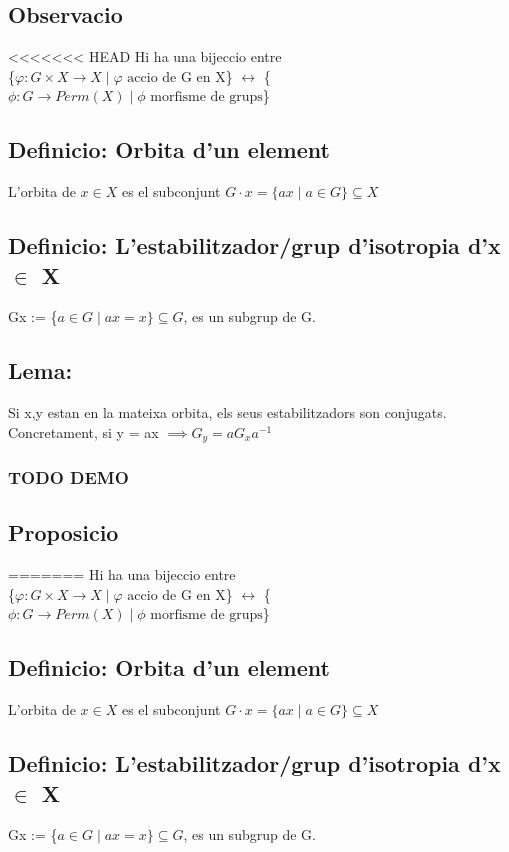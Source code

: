 \documentclass[11pt]{article}
\begin{document}
\subsection{Observacio}
<<<<<<< HEAD
\label{sec:orgb9528f3}
Hi ha una bijeccio entre \\
\{\(\varphi: G \times X \to X \mid \varphi \text{ accio de G en X}\)\} \(\leftrightarrow\) \{\(\phi: G \to Perm(X) \mid \phi \text{ morfisme de grups}\)\}
\subsection{Definicio: Orbita d'un element}
\label{sec:org6f56149}
L'orbita de \(x \in X\) es el subconjunt \(G \cdot x = \{ax \mid a \in G \} \subseteq X\)
\subsection{Definicio: L'estabilitzador/grup d'isotropia d'x \(\in\) X}
\label{sec:orga20a9b9}
Gx := \{\(a \in G \mid ax = x \} \subseteq G\), es un subgrup de G.
\subsection{Lema:}
\label{sec:org660e68a}
Si x,y estan en la mateixa orbita, els seus estabilitzadors son conjugats. \\
Concretament, si y = ax \(\implies G_y = aG_{x}a^{-1}\)
\subsubsection{{\bfseries\sffamily TODO} DEMO}
\label{sec:orga446ca3}

\subsection{Proposicio}
\label{sec:orgf78906f}
=======
\label{sec:org0ed754e}
Hi ha una bijeccio entre \\
\{\(\varphi: G \times X \to X \mid \varphi \text{ accio de G en X}\)\} \(\leftrightarrow\) \{\(\phi: G \to Perm(X) \mid \phi \text{ morfisme de grups}\)\}
\subsection{Definicio: Orbita d'un element}
\label{sec:orgbe199e9}
L'orbita de \(x \in X\) es el subconjunt \(G \cdot x = \{ax \mid a \in G \} \subseteq X\)
\subsection{Definicio: L'estabilitzador/grup d'isotropia d'x \(\in\) X}
\label{sec:orgdd8bb4b}
Gx := \{\(a \in G \mid ax = x \} \subseteq G\), es un subgrup de G.
\end{document}
